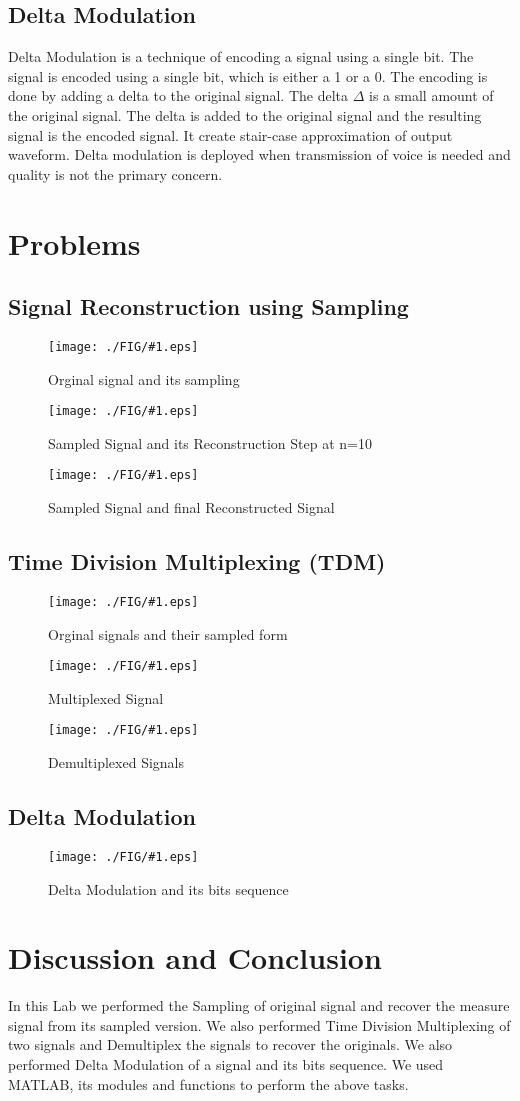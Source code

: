 \documentclass[a4paper,11pt]{article}
\newcommand{\mobs}[2]{
    \begin{figure}[H]
        \centering
        \texttt{[image: ./FIG/\#1.eps]}
        \caption{#2}
    \end{figure}
   
}
\begin{document}
\subsection{Delta Modulation}
Delta Modulation is a technique of encoding a signal using a single bit. The signal is encoded using a single bit, which is either a 1 or a 0. The encoding is done by adding a delta to the original signal. The delta $\Delta$ is a small amount of the original signal. The delta is added to the original signal and the resulting signal is the encoded signal. It create stair-case approximation of output waveform. Delta modulation is deployed when transmission of voice is needed and quality is not the primary concern.

\pagebreak
\section{Problems}

\subsection{Signal Reconstruction using Sampling}

\mobs{Sampling1}{Orginal signal and its sampling}
\mobs{Sampling2}{Sampled Signal and its Reconstruction Step at n=10}
\mobs{Sampling3}{Sampled Signal and final  Reconstructed Signal}



\subsection{Time Division Multiplexing (TDM)}

\mobs{TDM1}{Orginal signals and their sampled form}
\mobs{TDM2}{Multiplexed Signal}
\mobs{TDM3}{Demultiplexed Signals}


\subsection{Delta Modulation}

\mobs{Delta}{ Delta Modulation and its bits sequence}


\section{Discussion and Conclusion}
In this Lab we performed the Sampling of original signal and recover the measure signal from its sampled version. We also performed Time Division Multiplexing of two signals and Demultiplex the signals to recover the originals. We also performed Delta Modulation of a signal and its bits sequence. We used MATLAB, its modules and functions to perform the above tasks.
\end{document}
